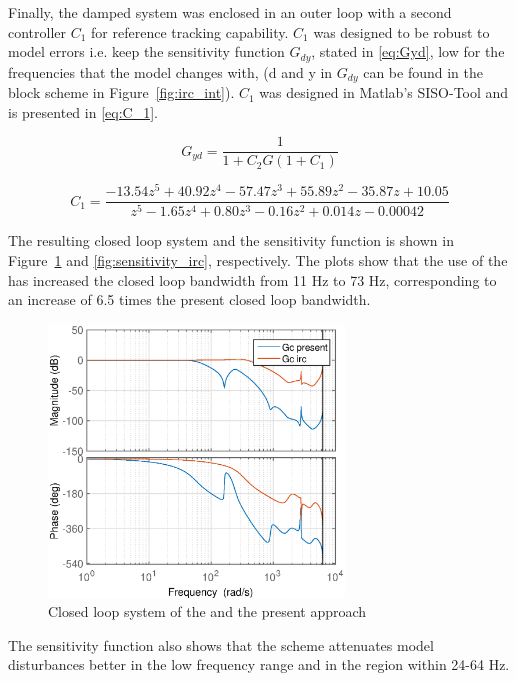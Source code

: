 Finally, the damped system was enclosed in an outer loop with a second controller $C_1$ for reference tracking capability. $C_1$ was designed to be robust to model errors i.e. keep the sensitivity function $G_{dy}$, stated in \eqref{eq:Gyd}, low for the frequencies that the model changes with, (d and y in $G_{dy}$ can be found in the block scheme in Figure~\ref{fig:irc_int}). $C_1$ was designed in Matlab's  SISO-Tool and is presented in \eqref{eq:C_1}.

\begin{equation}
  \label{eq:Gyd}
  G_{yd} = \frac{1}{1 + C_2G(1 + C_1)}
\end{equation}

\begin{equation}
  \label{eq:C_1}
  C_1 = \frac{-13.54 z^5 + 40.92 z^4 - 57.47 z^3 + 55.89 z^2 - 35.87 z + 10.05}{z^5 - 1.65 z^4 + 0.80 z^3 - 0.16 z^2 + 0.014 z - 0.00042}
\end{equation}

The resulting closed loop system and the sensitivity function is shown in Figure~\ref{fig:irc_totalclosed} and \ref{fig:sensitivity_irc}, respectively. The plots show that the use of the \abbrIRC has increased the closed loop bandwidth from 11 Hz to 73 Hz, corresponding to an increase of 6.5 times the present closed loop bandwidth.

\begin{figure}[h!]
  \centering
  \includegraphics[width=0.7\textwidth]{fig/matlab/totalclosedloop.eps}
  \caption{\label{fig:irc_totalclosed} Closed loop system of the \abbrIRC and the present approach}
\end{figure}

The \abbrIRC sensitivity function also shows that the \abbrIRC scheme attenuates model disturbances better in the low frequency range and in the region within 24-64 Hz.

